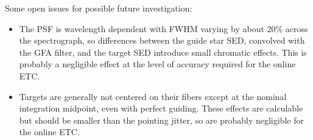 \documentclass[11pt]{article}
\begin{document}
Some open issues for possible future investigation:
\begin{itemize}
\item The PSF is wavelength dependent with FWHM varying by about 20\% across the spectrograph, so differences between the guide star SED, convolved with the GFA filter, and the target SED introduce small chromatic effects. This is probably a negligible effect at the level of accuracy required for the online ETC.
\item Targets are generally not centered on their fibers except at the nominal integration midpoint, even with perfect guiding. These effects are calculable but should be smaller than the pointing jitter, so are probably negligible for the online ETC.
\end{itemize}
\end{document}
